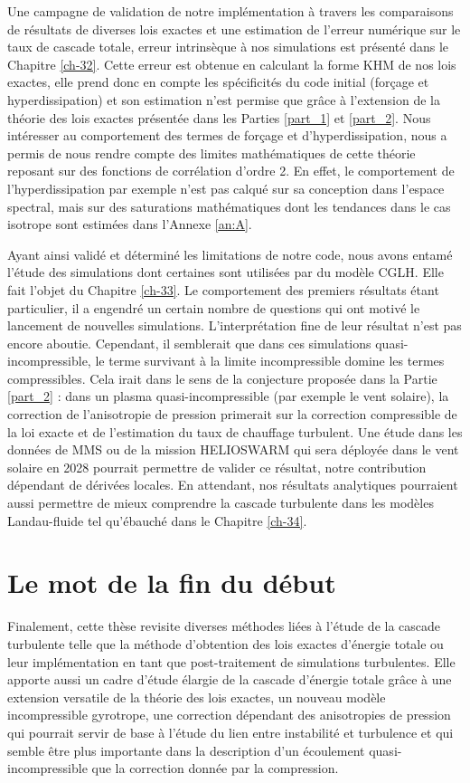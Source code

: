 Une campagne de validation de notre implémentation à travers les comparaisons de résultats de diverses lois exactes et une estimation de l'erreur numérique sur le taux de cascade totale, erreur intrinsèque à nos simulations est présenté dans le Chapitre \ref{ch-32}. Cette erreur est obtenue en calculant la forme \acs{KHM} de nos lois exactes, elle prend donc en compte les spécificités du code initial (forçage et hyperdissipation) et son estimation n'est permise que grâce à l'extension de la théorie des lois exactes présentée dans les Parties \ref{part_1} et \ref{part_2}. Nous intéresser au comportement des termes de forçage et d'hyperdissipation, nous a permis de nous rendre compte des limites mathématiques de cette théorie reposant sur des fonctions de corrélation d'ordre 2. En effet, le comportement de l'hyperdissipation par exemple n'est pas calqué sur sa conception dans l'espace spectral, mais sur des saturations mathématiques dont les tendances dans le cas isotrope sont estimées dans l'Annexe \ref{an:A}. 

Ayant ainsi validé et déterminé les limitations de notre code, nous avons entamé l'étude des simulations dont certaines sont utilisées par \cite{ferrand_fluid_2021} du modèle \ac{CGLH}. Elle fait l'objet du Chapitre \ref{ch-33}.  Le comportement des premiers résultats étant particulier, il a engendré un certain nombre de questions qui ont motivé le lancement de nouvelles simulations. L'interprétation fine de leur résultat n'est pas encore aboutie. Cependant, il semblerait que dans ces simulations quasi-incompressible, le terme survivant à la limite incompressible domine les termes compressibles. Cela irait dans le sens de la conjecture proposée dans la Partie \ref{part_2} : dans un plasma quasi-incompressible (par exemple le vent solaire), la correction de l'anisotropie de pression primerait sur la correction compressible de la loi exacte et de l'estimation du taux de chauffage turbulent. Une étude dans les données de \acs{MMS} ou de la mission HELIOSWARM qui sera déployée dans le vent solaire en 2028 pourrait permettre de valider ce résultat, notre contribution dépendant de dérivées locales. En attendant, nos résultats analytiques pourraient aussi permettre de mieux comprendre la cascade turbulente dans les modèles Landau-fluide tel qu'ébauché dans le Chapitre \ref{ch-34}.

\section{Le mot de la fin du début}
Finalement, cette thèse revisite diverses méthodes liées à l'étude de la cascade turbulente telle que la méthode d'obtention des lois exactes d'énergie totale ou leur implémentation en tant que post-traitement de simulations turbulentes. Elle apporte aussi un cadre d'étude élargie de la cascade d'énergie totale grâce à une extension versatile de la théorie des lois exactes, un nouveau modèle incompressible gyrotrope, une correction dépendant des anisotropies de pression qui pourrait servir de base à l'étude du lien entre instabilité et turbulence et qui semble être plus importante dans la description d'un écoulement quasi-incompressible que la correction donnée par la compression. 

